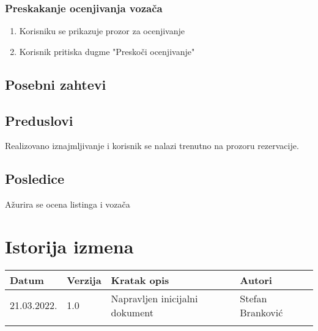 \documentclass[12pt]{article}
\begin{document}
\subsubsection{Preskakanje ocenjivanja vozača}
\begin{enumerate}
  \item Korisniku se prikazuje prozor za ocenjivanje
  \item Korisnik pritiska dugme "Preskoči ocenjivanje"
\end{enumerate}
\subsection{Posebni zahtevi}
\subsection{Preduslovi}
Realizovano iznajmljivanje i korisnik se nalazi trenutno na prozoru rezervacije.
\subsection{Posledice}
Ažurira se ocena listinga i vozača
\section{Istorija izmena}
\begin{center}
\begin{tabular}{ | m{2cm} | m{1.5cm}| m{6cm} | m{5cm} | } 
\hline
Datum & Verzija & Kratak opis & Autori \\ 
\hline
 21.03.2022. & 1.0 & Napravljen inicijalni dokument & Stefan Branković\\ 
\hline
&&&\\ 
\hline
\end{tabular}
\end{center}
\end{document}
